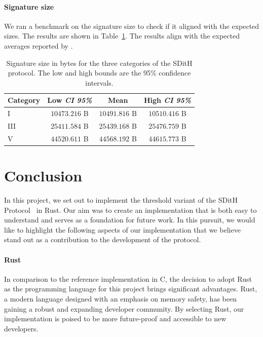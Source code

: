 \documentclass[11pt]{report}
\theoremstyle{definition}
\theoremstyle{plain}
\begin{document}
\subsubsection{Signature size}
We ran a benchmark on the signature size to check if it aligned with the expected sizes. The results are shown in Table~\ref{tab:sig_size}. The results align with the expected averages reported by \cite{aguilarsyndrome11}.

\begin{table}[ht!]
  \centering
  \begin{tabular}{lccc}
    \hline
    \textbf{Category} & \textbf{Low \textit{CI 95\%}} & \textbf{Mean} & \textbf{High \textit{CI 95\%}} \\
    \hline
    I                 & $10473.216$ B                 & $10491.816$ B & $10510.416$ B                  \\
    III               & $25411.584$ B                 & $25439.168$ B & $25476.759$ B                  \\
    V                 & $44520.611$ B                 & $44568.192$ B & $44615.773$ B                  \\
    \hline
  \end{tabular}
  \caption{Signature size in bytes for the three categories of the SDitH protocol. The low and high bounds are the 95\% confidence intervals.}\label{tab:sig_size}
\end{table}


\chapter{Conclusion}\label{ch:conclusion}

In this project, we set out to implement the threshold variant of the SDitH Protocol~\cite{aguilarsyndrome11} in Rust. Our aim was to create an implementation that is both easy to understand and serves as a foundation for future work. In this pursuit, we would like to highlight the following aspects of our implementation that we believe stand out as a contribution to the development of the protocol.

\subsubsection{Rust}

In comparison to the reference implementation in C, the decision to adopt Rust as the programming language for this project brings significant advantages. Rust, a modern language designed with an emphasis on memory safety, has been gaining a robust and expanding developer community. By selecting Rust, our implementation is poised to be more future-proof and accessible to new developers.
\end{document}

